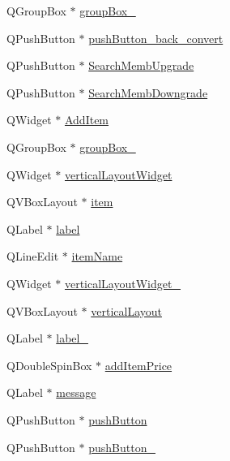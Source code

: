 \begin{DoxyCompactItemize}
\item 
Q\+Group\+Box $\ast$ \hyperlink{class_ui___main_window_a6932c9851098c363e9c66a2e1cb65f02}{group\+Box\+\_}
\item 
Q\+Push\+Button $\ast$ \hyperlink{class_ui___main_window_a53b779d0a6f1a50904d937a4eca27386}{push\+Button\+\_\+back\+\_\+convert}
\item 
Q\+Push\+Button $\ast$ \hyperlink{class_ui___main_window_aa22a3384e23a74a112e4f90fff76445e}{Search\+Memb\+Upgrade}
\item 
Q\+Push\+Button $\ast$ \hyperlink{class_ui___main_window_afc40bda6eea39f54c945fcb9ffa49d47}{Search\+Memb\+Downgrade}
\item 
Q\+Widget $\ast$ \hyperlink{class_ui___main_window_a1702ecb9113f87732ea1ba9a795e4951}{Add\+Item}
\item 
Q\+Group\+Box $\ast$ \hyperlink{class_ui___main_window_a36173f9bef3570d2655d9b8e75b74525}{group\+Box\+\_}
\item 
Q\+Widget $\ast$ \hyperlink{class_ui___main_window_a805d415fff07a22a85219e1f22f2da28}{vertical\+Layout\+Widget}
\item 
Q\+V\+Box\+Layout $\ast$ \hyperlink{class_ui___main_window_af54d87835ccd4478a69e1c4fffd887d4}{item}
\item 
Q\+Label $\ast$ \hyperlink{class_ui___main_window_ad9c89133780f28e6efa2ec17ceb9cff5}{label}
\item 
Q\+Line\+Edit $\ast$ \hyperlink{class_ui___main_window_af7fedde477ef36ae36ca58ea96294df0}{item\+Name}
\item 
Q\+Widget $\ast$ \hyperlink{class_ui___main_window_a62b94f49d79e473da0f96d804b9c3af7}{vertical\+Layout\+Widget\+\_}
\item 
Q\+V\+Box\+Layout $\ast$ \hyperlink{class_ui___main_window_aecd96a04789fcfec3f98d80390ad8184}{vertical\+Layout}
\item 
Q\+Label $\ast$ \hyperlink{class_ui___main_window_a2e2516d755e4dd53fc905dabddf2738a}{label\+\_}
\item 
Q\+Double\+Spin\+Box $\ast$ \hyperlink{class_ui___main_window_ae63aa0a91eb1cb04119aecb0a87d6e62}{add\+Item\+Price}
\item 
Q\+Label $\ast$ \hyperlink{class_ui___main_window_a7ab36d2e9d2017b4b5664383a1a75104}{message}
\item 
Q\+Push\+Button $\ast$ \hyperlink{class_ui___main_window_ad332d93084584930878f1daf5f84cdbf}{push\+Button}
\item 
Q\+Push\+Button $\ast$ \hyperlink{class_ui___main_window_adafdad7c065227c5d14b68d75789cbe2}{push\+Button\+\_}

\end{DoxyCompactItemize}
